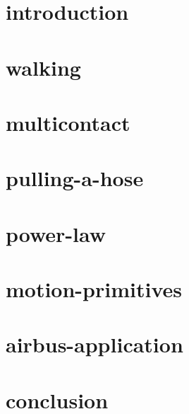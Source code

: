 \documentclass{beamer}
\begin{document}
\begin{frame}{}
  \titlepage
\end{frame}

\section{introduction}
\setcounter{subsection}{1}

\section{walking}
\setcounter{subsection}{2}

\section{multicontact}
\setcounter{subsection}{3}

\section{pulling-a-hose}
\setcounter{subsection}{4}

\section{power-law}
\setcounter{subsection}{5}

\section{motion-primitives}
\setcounter{subsection}{6}

\section{airbus-application}
\setcounter{subsection}{7}

\section{conclusion}
\setcounter{subsection}{8}
\end{document}
